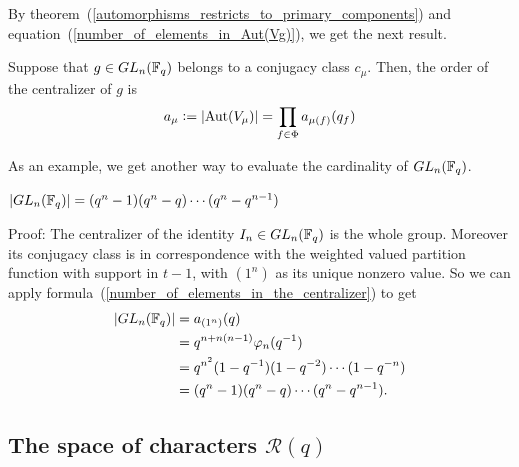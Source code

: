 By theorem~(\ref{automorphisms_restricts_to_primary_components}) and equation~(\ref{number_of_elements_in_Aut(Vg)}), we get the next result.
\begin{dang}
\begin{theorem}\cite{macdonald1998symmetric}\label{number_of_elements_in_the_centralizer}
        Suppose that $g\in GL_n(\mathbb{F}_q)$ belongs to a conjugacy class $c_\mu$. Then, the order of the centralizer of $g$ is
        \begin{equation}
            a_\mu\bydef |\text{Aut}(V_\mu)|=\prod_{f\in\Phi}a_{\mu(f)}(q_f)
        \end{equation}
    \end{theorem}
\end{dang}
As an example, we get another way to evaluate the cardinality of $GL_n(\mathbb{F}_q)$.
\begin{dang}
    \begin{corollary}
        $|GL_n(\mathbb{F}_q)|=(q^n-1)(q^n-q)\cdots(q^n-q^{n-1})$
    \end{corollary}
\end{dang}
Proof: The centralizer of the identity $I_n\in GL_n(\mathbb{F}_q)$ is the whole group. Moreover its conjugacy class is in correspondence with the weighted valued partition function with support in $t-1$, with $(1^n)$ as its unique nonzero value. So we can apply formula~(\ref{number_of_elements_in_the_centralizer}) to get
\begin{equation}
\begin{split}
      |GL_n(\mathbb{F}_q)|&=a_{(1^n)}(q)\\
      &=q^{n+n(n-1)}\varphi_n(q^{-1})\\
      &=q^{n^2}(1-q^{-1})(1-q^{-2})\cdots(1-q^{-n})\\
      &=(q^n-1)(q^n-q)\cdots(q^n-q^{n-1}).
\end{split}
\end{equation}
\subsection{\texorpdfstring{The space of characters $\mathcal{R}(q)$}{The space of characters R(q)}}

